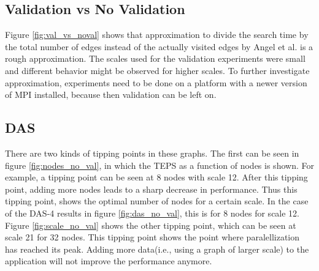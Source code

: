 \subsection{Validation vs No Validation}
\label{dis:val}
Figure \ref{fig:val_vs_noval} shows that approximation to divide the search time by the total number of edges instead of the actually visited edges by Angel et al.\cite{angel2012graph} is a rough approximation. The scales used for the validation experiments were small and different behavior might be observed for higher scales. To further investigate approximation, experiments need to be done on a platform with a newer version of MPI installed, because then validation can be left on.

\subsection{DAS}
There are two kinds of tipping points in these graphs. The first can be seen in figure \ref{fig:nodes_no_val}, in which the TEPS as a function of nodes is shown. For example, a tipping point can be seen at 8 nodes with scale 12. After this tipping point, adding more nodes leads to a sharp decrease in performance. Thus this tipping point, shows the optimal number of nodes for a certain scale. In the case of the DAS-4 results in figure \ref{fig:das_no_val}, this is for 8 nodes for scale 12. Figure \ref{fig:scale_no_val} shows the other tipping point, which can be seen at scale 21 for 32 nodes. This tipping point shows the point where paralellization has reached its peak. Adding more data(i.e., using a graph of larger scale) to the application will not improve the performance anymore. 



